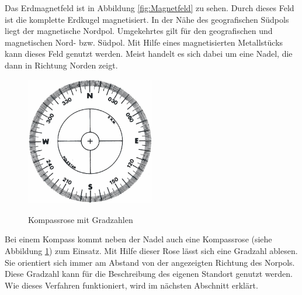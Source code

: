  
Das Erdmagnetfeld ist in Abbildung \ref{fig:Magnetfeld} zu sehen. Durch dieses Feld ist die komplette Erdkugel magnetisiert. In der Nähe des geografischen Südpols liegt der magnetische Nordpol. Umgekehrtes gilt für den geografischen und magnetischen Nord- bzw. Südpol.
Mit Hilfe eines magnetisierten Metallstücks kann dieses Feld genutzt werden. Meist handelt es sich dabei um  eine Nadel,  die dann in Richtung Norden zeigt.


\begin{figure}[h]
  \centering
    \includegraphics[width=0.50\textwidth]{ref/images/kompassrose.jpg}
   \caption{Kompassrose mit Gradzahlen}
  \label{fig:Kompassrose}
   \cite{Kompassrose}
\end{figure}


 
Bei einem Kompass kommt neben der Nadel auch eine Kompassrose  (siehe Abbildung \ref{fig:Kompassrose}) zum Einsatz. Mit Hilfe dieser Rose lässt sich eine Gradzahl ablesen. Sie orientiert sich immer am Abstand von der angezeigten Richtung des Norpols. Diese Gradzahl kann für die Beschreibung des eigenen Standort genutzt werden. Wie dieses Verfahren funktioniert, wird im nächsten Abschnitt erklärt.

